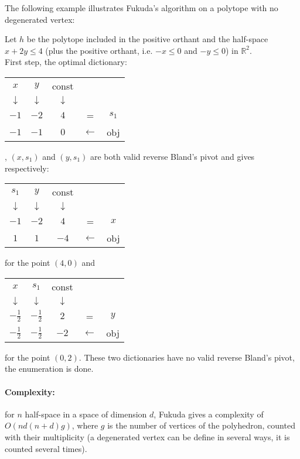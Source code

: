 The following example illustrates Fukuda's algorithm on a polytope with no degenerated vertex:

\begin{example}
	Let $h$ be the polytope included in the positive orthant and the half-space $x+2y\leq 4$ (plus the positive orthant, i.e. $-x\leq 0$ and $-y\leq 0$) in $\mathbb{R}^2$.\\
	First step, the optimal dictionary:
	\begin{tabular}{| c | c || c || c c |}
	\hline	
	$x$ & $y$ & const & & \\
	$\downarrow$ &$\downarrow$ &$\downarrow$ & & \\
	\hline
	\hline	
   	$-1$ & $-2$ & $4$ & = & $s_1$\\ \hline \hline	
   	$-1$ & $-1$ & $0$ & $\leftarrow$ & obj \\
   	\hline	
 	\end{tabular}, 
 	$(x,s_1)$ and $(y,s_1)$ are both valid reverse Bland's pivot and gives respectively:
 	\begin{tabular}{| c | c || c || c c |}
	\hline	
	$s_1$ & $y$ & const & & \\
	$\downarrow$ &$\downarrow$ &$\downarrow$ & & \\
	\hline
	\hline	
   	$-1$ & $-2$ & $4$ & = & $x$\\ \hline \hline	
   	$1$ & $1$ & $-4$ & $\leftarrow$ & obj \\
   	\hline	
 	\end{tabular}
 	for the point $(4,0)$ and
 	\begin{tabular}{| c | c || c || c c |}
	\hline	
	$x$ & $s_1$ & const & & \\
	$\downarrow$ &$\downarrow$ &$\downarrow$ & & \\
	\hline
	\hline	
   	$-\frac{1}{2}$ & $-\frac{1}{2}$ & $2$ & = & $y$\\ \hline \hline	
   	$-\frac{1}{2}$ & $-\frac{1}{2}$ & $-2$ & $\leftarrow$ & obj \\
   	\hline	
 	\end{tabular}
 	for the point $(0,2)$. These two dictionaries have no valid reverse Bland's pivot, the enumeration is done.
	\label{example-fukuda}
\end{example}

\paragraph{Complexity:} for $n$ half-space in a space of dimension $d$, Fukuda gives a complexity of $O(nd(n+d)g)$, where $g$ is the number of vertices of the polyhedron, counted with their multiplicity (a degenerated vertex can be define in several ways, it is counted several times). 
